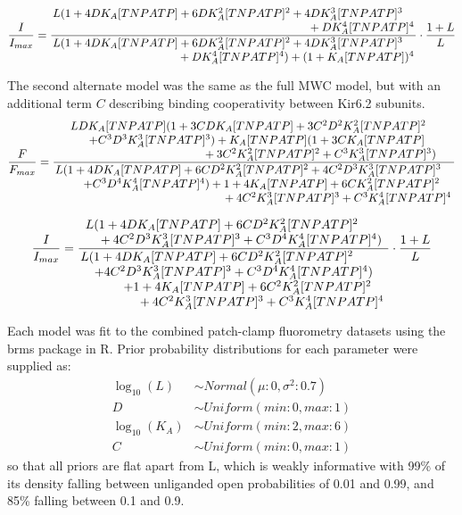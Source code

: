 \documentclass[10pt,lineno, doublespacing]{elife_modified}
\begin{document}
\begin{equation} \label{eq:gating_2}
\frac{I}{I_{max}} = \frac{\splitfrac
    {L(1+4DK_A[TNPATP]+6DK_A^2[TNPATP]^2+4DK_A^3[TNPATP]^3}
    {+DK_A^4[TNPATP]^4}}{\splitfrac
    {L(1+4DK_A[TNPATP]+6DK_A^2[TNPATP]^2+4DK_A^3[TNPATP]^3}
    {+DK_A^4[TNPATP]^4)+(1+K_A[TNPATP])^4}}\cdot
   \frac
    {1+L}
    {L}
\end{equation}

The second alternate model was the same as the full MWC model, but with an additional term $C$ describing binding cooperativity between Kir6.2 subunits.
\begin{equation} \label{eq:binding_3}
\frac{F}{F_{max}} = \frac{\splitfrac
    {LDK_A[TNPATP](1+3CDK_A[TNPATP]+3C^2D^2K_A^2[TNPATP]^2}{\splitfrac
    {+C^3D^3K_A^3[TNPATP]^3)+K_A[TNPATP](1+3CK_A[TNPATP]}
    {+3C^2K_A^2[TNPATP]^2+C^3K_A^3[TNPATP]^3)}}}{\splitfrac
    {L(1+4DK_A[TNPATP]+6CD^2K_A^2[TNPATP]^2+4C^2D^3K_A^3[TNPATP]^3}{\splitfrac
    {+C^3D^4K_A^4[TNPATP]^4)+1+4K_A[TNPATP]+6CK_A^2[TNPATP]^2}
    {+4C^2K_A^3[TNPATP]^3+C^3K_A^4[TNPATP]^4}}}
\end{equation}

\begin{equation} \label{eq:gating_3}
\frac{I}{I_{max}} = \frac{\splitfrac
    {L(1+4DK_A[TNPATP]+6CD^2K_A^2[TNPATP]^2}
    {+4C^2D^3K_A^3[TNPATP]^3+C^3D^4K_A^4[TNPATP]^4)}}{\splitfrac
    {L(1+4DK_A[TNPATP]+6CD^2K_A^2[TNPATP]^2}{\splitfrac
    {+4C^2D^3K_A^3[TNPATP]^3+C^3D^4K_A^4[TNPATP]^4)}{\splitfrac
    {+1+4K_A[TNPATP]+6C^2K_A^2[TNPATP]^2}
    {+4C^2K_A^3[TNPATP]^3+C^3K_A^4[TNPATP]^4}}}}\cdot
   \frac
    {1+L}
    {L}
\end{equation}

Each model was fit to the combined patch-clamp fluorometry datasets using the brms package \citep{RN109, RN108} in R.
Prior probability distributions for each parameter were supplied as:
\begin{equation} \label{eq:priors}
\begin{aligned}
\log_{10}(L) &\sim Normal(\mu: 0, \sigma^2: 0.7) \\
D &\sim Uniform(min: 0, max: 1) \\
\log_{10}(K_A) &\sim Uniform(min: 2, max: 6) \\
C &\sim Uniform(min: 0, max: 1)
\end{aligned}
\end{equation}
so that all priors are flat apart from L, which is weakly informative with 99\% of its density falling between unliganded open probabilities of 0.01 and 0.99, and 85\% falling between 0.1 and 0.9.
\end{document}

